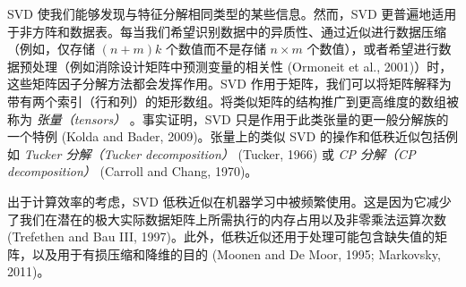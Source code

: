 SVD 使我们能够发现与特征分解相同类型的某些信息。然而，SVD 更普遍地适用于非方阵和数据表。每当我们希望识别数据中的异质性、通过近似进行数据压缩（例如，仅存储 $ (n + m)k $ 个数值而不是存储 $ n \times m $ 个数值），或者希望进行数据预处理（例如消除设计矩阵中预测变量的相关性 (Ormoneit et al., 2001)）时，这些矩阵因子分解方法都会发挥作用。SVD 作用于矩阵，我们可以将矩阵解释为带有两个索引（行和列）的矩形数组。将类似矩阵的结构推广到更高维度的数组被称为 \emph{张量（tensors）} 。事实证明，SVD 只是作用于此类张量的更一般分解族的一个特例 (Kolda and Bader, 2009)。张量上的类似 SVD 的操作和低秩近似包括例如 \emph{Tucker 分解（Tucker decomposition）} (Tucker, 1966) 或 \emph{CP 分解（CP decomposition）} (Carroll and Chang, 1970)。

出于计算效率的考虑，SVD 低秩近似在机器学习中被频繁使用。这是因为它减少了我们在潜在的极大实际数据矩阵上所需执行的内存占用以及非零乘法运算次数 (Trefethen and Bau III, 1997)。此外，低秩近似还用于处理可能包含缺失值的矩阵，以及用于有损压缩和降维的目的 (Moonen and De Moor, 1995; Markovsky, 2011)。
